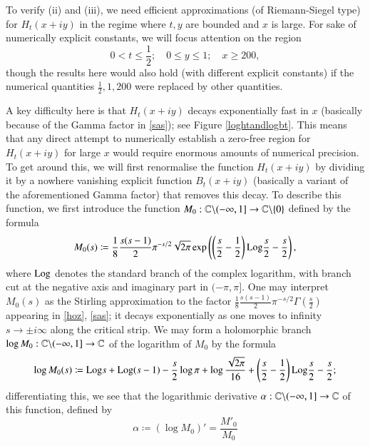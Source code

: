 To verify (ii) and (iii), we need efficient approximations (of Riemann-Siegel type) for $H_t(x+iy)$ in the regime where $t,y$ are bounded and $x$ is large.  For sake of numerically explicit constants, we will focus attention on the region
\begin{equation}\label{region}
0 < t \leq \frac{1}{2}; \quad 0 \leq y \leq 1; \quad x \geq 200,
\end{equation}
though the results here would also hold (with different explicit constants) if the numerical quantities $\frac{1}{2}, 1, 200$ were replaced by other quantities.

A key difficulty here is that $H_t(x+iy)$ decays exponentially fast in $x$ (basically because of the Gamma factor in \eqref{sas}); see Figure \ref{loghtandlogbt}.  This means that any direct attempt to numerically establish a zero-free region for $H_t(x+iy)$ for large $x$ would require enormous amounts of numerical precision.  To get around this, we will first renormalise the function $H_t(x+iy)$ by dividing it by a nowhere vanishing explicit function $B_t(x+iy)$ (basically a variant of the aforementioned Gamma factor) that removes this decay.  To describe this function, we first introduce the function $M_0: \mathbb{C} \backslash (-\infty,1] \to \mathbb{C} \backslash \{0\}$ defined by the formula
\begin{equation}\label{M-def}
 M_0(s) \coloneqq \frac{1}{8} \frac{s(s-1)}{2} \pi^{-s/2} \sqrt{2\pi} \exp\left( \left(\frac{s}{2}-\frac{1}{2}\right){\operatorname{Log}} \frac{s}{2} - \frac{s}{2} \right),
\end{equation}
where ${\operatorname{Log}}$ denotes the standard branch of the complex logarithm, with branch cut at the negative axis and imaginary part in $(-\pi,\pi]$. One may interpret $M_0(s)$ as the Stirling approximation to the factor $\frac{1}{8} \frac{s(s-1)}{2} \pi^{-s/2} \Gamma\left(\frac{s}{2}\right)$ appearing in \eqref{hoz}, \eqref{sas}; it decays exponentially as one moves to infinity $s \to \pm i \infty$ along the critical strip.  We may form a holomorphic branch $\log M_0: \mathbb{C} \backslash (-\infty,1] \to \mathbb{C}$ of the logarithm of $M_0$ by the formula
\begin{equation}\label{logM}
 \log M_0(s) \coloneqq {\operatorname{Log}} s + {\operatorname{Log}}(s-1) - \frac{s}{2} \log \pi + \log \frac{\sqrt{2\pi}}{16} + 
 \left(\frac{s}{2}-\frac{1}{2}\right){\operatorname{Log}} \frac{s}{2} - \frac{s}{2};
\end{equation}
differentiating this, we see that the logarithmic derivative $\alpha: \mathbb{C} \backslash (-\infty,1] \to \mathbb{C}$ of this function, defined by
\begin{equation}\label{alpha-def}
\alpha \coloneqq (\log M_0)' = \frac{M'_0}{M_0}
\end{equation}
